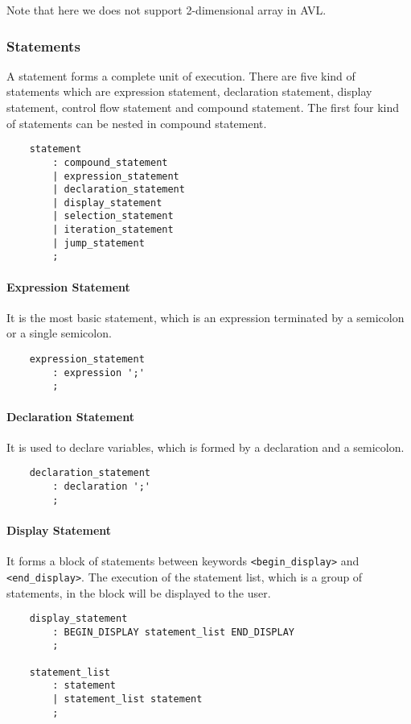 Note that here we does not support 2-dimensional array in AVL.

\subsubsection{Statements}

A statement forms a complete unit of execution. There are five kind of statements which are
expression statement, declaration statement, display statement, control flow statement and compound
statement. The first four kind of statements can be nested in compound statement.

\begin{verbatim}
    statement
        : compound_statement
        | expression_statement
        | declaration_statement
        | display_statement
        | selection_statement
        | iteration_statement
        | jump_statement
        ;
\end{verbatim}

\paragraph{Expression Statement}
It is the most basic statement, which is an expression terminated by a semicolon or a single
semicolon.

\begin{verbatim}
    expression_statement
        : expression ';'
        ;
\end{verbatim}

\paragraph{Declaration Statement}
It is used to declare variables, which is formed by a declaration and a semicolon.
\begin{verbatim}
    declaration_statement
        : declaration ';'
        ;
\end{verbatim}

\paragraph{Display Statement}
It forms a block of statements between keywords \verb"<begin_display>" and \verb"<end_display>". The
execution of the statement list, which is a group of statements, in the block will be displayed to
the user.

\begin{verbatim}
    display_statement
        : BEGIN_DISPLAY statement_list END_DISPLAY
        ;

    statement_list
        : statement
        | statement_list statement
        ;
\end{verbatim}

